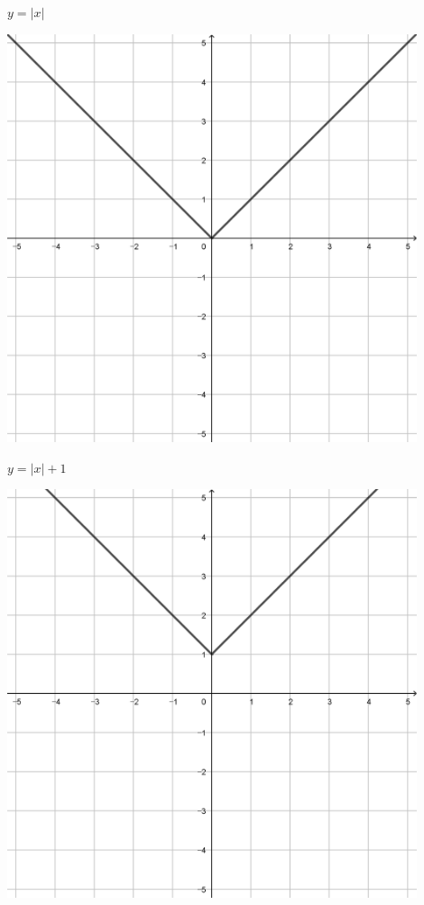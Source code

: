 \documentclass[a4paper]{oblivoir}
\begin{document}
\clearpage
\begin{minipage}{0.45\textwidth}\centering
\(y=|x|\)
\par\bigskip\includegraphics[width=0.9\textwidth]{img/3_piecewise_13}
\end{minipage}
\begin{minipage}{0.45\textwidth}\centering
\(y=|x|+1\)
\par\bigskip\includegraphics[width=0.9\textwidth]{img/3_piecewise_14}
\end{minipage}\bigskip\bigskip\par
\end{document}

